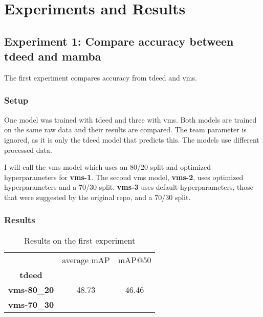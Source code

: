 \chapter{Experiments and Results}
\label{chap:experiments}

\section{Experiment 1: Compare accuracy between tdeed and mamba}

The first experiment compares accuracy from \acrshort{tdeed} and \acrshort{vms}. 

\subsection{Setup}
\label{ssec:ex1_setup}

One model was trained with \acrshort{tdeed} and three with \acrlong{vms}. Both models are trained on the same raw data and their results are compared. The team parameter is ignored, as it is only the \acrshort{tdeed} model that predicts this. The models use different processed data. 

I will call the \acrshort{vms} model which uses an 80/20 split and optimized hyperparameters for \textbf{\acrshort{vms}-1}. The second \acrshort{vms} model, \textbf{\acrshort{vms}-2}, uses optimized hyperparameters and a 70/30 split. \textbf{\acrshort{vms}-3} uses default hyperparameters, those that were suggested by the original repo, and a 70/30 split. 

\subsection{Results}


\begin{table}
    \centering
    \begin{tabular}{ccc}
         & average mAP & mAP@50\\
        \textbf{\acrshort{tdeed}} &  & \\
        \textbf{\acrshort{vms}-80\_20} & 48.73 & 46.46 \\
        \textbf{\acrshort{vms}-70\_30} &  & \\
    \end{tabular}
    \caption{Results on the first experiment}
    \label{tab:results_ex1}
\end{table}


